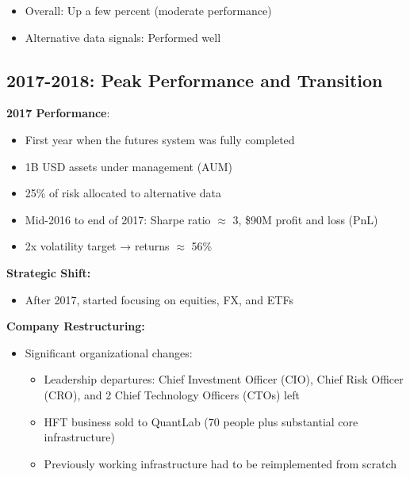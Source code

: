 \documentclass[11pt, letterpaper]{article}
\providecommand{\tightlist}{%
\setlength{\itemsep}{0pt}
\setlength{\parskip}{0pt}}
\begin{document}
  \begin{itemize}
    \item Overall: Up a few percent (moderate performance)

    \item Alternative data signals: Performed well
  \end{itemize}

  \subsection{2017-2018: Peak Performance and Transition}
  \label{peak-performance-and-transition}

  \textbf{2017 Performance}:

  \begin{itemize}
    \item First year when the futures system was fully completed

    \item 1B USD assets under management (AUM)

    \item 25\% of risk allocated to alternative data

    \item Mid-2016 to end of 2017: Sharpe ratio $\approx$ 3, \$90M profit
      and loss (PnL)

    \item 2x volatility target → returns $\approx$ 56\%
  \end{itemize}

  \textbf{Strategic Shift:}

  \begin{itemize}
    \tightlist

    \item After 2017, started focusing on equities, FX, and ETFs
  \end{itemize}

  \textbf{Company Restructuring:}

  \begin{itemize}
    \item Significant organizational changes:

      \begin{itemize}
        \item Leadership departures: Chief Investment Officer (CIO), Chief
          Risk Officer (CRO), and 2 Chief Technology Officers (CTOs)
          left

        \item HFT business sold to QuantLab (70 people plus substantial
          core infrastructure)

        \item Previously working infrastructure had to be reimplemented from
          scratch
      \end{itemize}
  \end{itemize}
\end{document}
